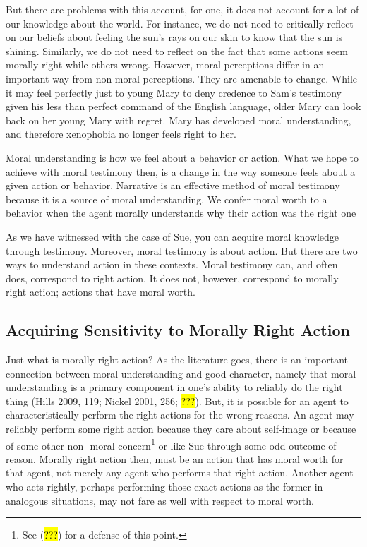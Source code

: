 \documentclass[
  letterpaper,
  DIV=11,
  numbers=noendperiod]{scrartcl}
\theoremstyle{remark}
\begin{document}
But there are problems with this account, for one, it does not account
for a lot of our knowledge about the world. For instance, we do not need
to critically reflect on our beliefs about feeling the sun's rays on our
skin to know that the sun is shining. Similarly, we do not need to
reflect on the fact that some actions seem morally right while others
wrong. However, moral perceptions differ in an important way from
non-moral perceptions. They are amenable to change. While it may feel
perfectly just to young Mary to deny credence to Sam's testimony given
his less than perfect command of the English language, older Mary can
look back on her young Mary with regret. Mary has developed moral
understanding, and therefore xenophobia no longer feels right to her.

Moral understanding is how we feel about a behavior or action. What we
hope to achieve with moral testimony then, is a change in the way
someone feels about a given action or behavior. Narrative is an
effective method of moral testimony because it is a source of moral
understanding. We confer moral worth to a behavior when the agent
morally understands why their action was the right one

As we have witnessed with the case of Sue, you can acquire moral
knowledge through testimony. Moreover, moral testimony is about action.
But there are two ways to understand action in these contexts. Moral
testimony can, and often does, correspond to right action. It does not,
however, correspond to morally right action; actions that have moral
worth.

\subsection{Acquiring Sensitivity to Morally Right
Action}\label{acquiring-sensitivity-to-morally-right-action}

Just what is morally right action? As the literature goes, there is an
important connection between moral understanding and good character,
namely that moral understanding is a primary component in one's ability
to reliably do the right thing (Hills 2009, 119; Nickel 2001, 256;
\hl{???}). But, it is possible for an agent to characteristically
perform the right actions for the wrong reasons. An agent may reliably
perform some right action because they care about self-image or because
of some other non- moral concern\footnote{See (\hl{???}) for a defense
  of this point.} or like Sue through some odd outcome of reason.
Morally right action then, must be an action that has moral worth for
that agent, not merely any agent who performs that right action. Another
agent who acts rightly, perhaps performing those exact actions as the
former in analogous situations, may not fare as well with respect to
moral worth.
\end{document}
